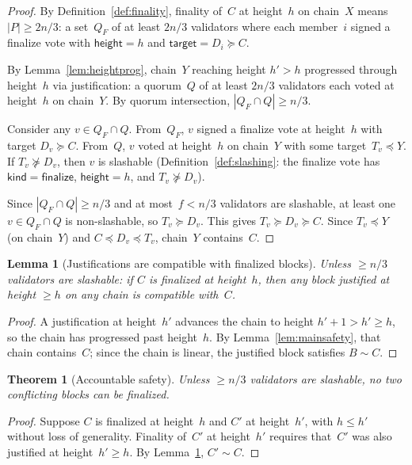\documentclass{article}
\newcommand{\target}{\mathsf{target}}
\newcommand{\kind}{\mathsf{kind}}
\newcommand{\height}{\mathsf{height}}
\newcommand{\finalize}{\mathsf{finalize}}
\theoremstyle{plain}
\newtheorem{theorem}{Theorem}
\newtheorem{lemma}{Lemma}
\theoremstyle{definition}
\theoremstyle{remark}
\begin{document}
\begin{proof}
By Definition~\ref{def:finality}, finality of~$C$ at height~$h$ on chain~$X$ means $|P| \geq 2n/3$: a set~$Q_F$ of at least $2n/3$ validators where each member~$i$ signed a finalize vote with $\height = h$ and $\target = D_i \succeq C$.

By Lemma~\ref{lem:heightprog}, chain~$Y$ reaching height $h' > h$ progressed through height~$h$ via justification: a quorum~$Q$ of at least $2n/3$ validators each voted at height~$h$ on chain~$Y$.
By quorum intersection, $|Q_F \cap Q| \geq n/3$.

Consider any $v \in Q_F \cap Q$.
From~$Q_F$, $v$ signed a finalize vote at height~$h$ with target $D_v \succeq C$.
From~$Q$, $v$ voted at height~$h$ on chain~$Y$ with some target~$T_v \preceq Y$.
If $T_v \not\succeq D_v$, then $v$ is slashable (Definition~\ref{def:slashing}: the finalize vote has $\kind = \finalize$, $\height = h$, and $T_v \not\succeq D_v$).

Since $|Q_F \cap Q| \geq n/3$ and at most~$f < n/3$ validators are slashable, at least one $v \in Q_F \cap Q$ is non-slashable, so $T_v \succeq D_v$.
This gives $T_v \succeq D_v \succeq C$.
Since $T_v \preceq Y$ (on chain~$Y$) and $C \preceq D_v \preceq T_v$, chain~$Y$ contains~$C$.
\end{proof}

\begin{lemma}[Justifications are compatible with finalized blocks]\label{lem:justcompat}
Unless $\geq n/3$ validators are slashable: if $C$ is finalized at height~$h$, then any block justified at height $\geq h$ on any chain is compatible with~$C$.
\end{lemma}

\begin{proof}
A justification at height~$h'$ advances the chain to height $h' + 1 > h' \geq h$, so the chain has progressed past height~$h$.
By Lemma~\ref{lem:mainsafety}, that chain contains~$C$; since the chain is linear, the justified block satisfies $B \sim C$.
\end{proof}

\begin{theorem}[Accountable safety]\label{thm:safety}
Unless $\geq n/3$ validators are slashable, no two conflicting blocks can be finalized.
\end{theorem}

\begin{proof}
Suppose $C$ is finalized at height~$h$ and $C'$ at height~$h'$, with $h \leq h'$ without loss of generality.
Finality of~$C'$ at height~$h'$ requires that~$C'$ was also justified at height~$h' \geq h$.
By Lemma~\ref{lem:justcompat}, $C' \sim C$.
\end{proof}
\end{document}
